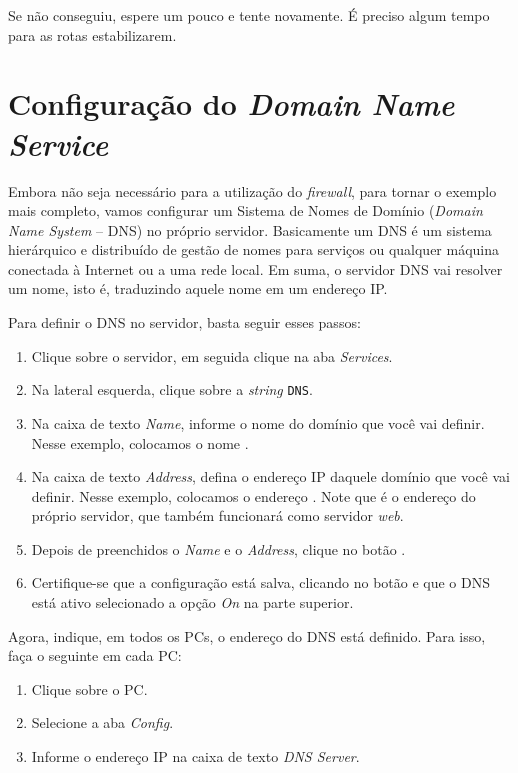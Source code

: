 Se não conseguiu, espere um pouco e tente novamente. É preciso algum tempo para as rotas estabilizarem.

\section{Configuração do \textit{Domain Name Service}}
Embora não seja necessário para a utilização do \textit{firewall}, para tornar o exemplo mais completo, vamos configurar um Sistema de Nomes de Domínio (\textit{Domain Name System} -- DNS) no próprio servidor. Basicamente um DNS é um sistema hierárquico e distribuído de gestão de nomes para  serviços ou qualquer máquina conectada à Internet ou a uma rede local. Em suma, o servidor DNS vai resolver um nome, isto é, traduzindo aquele nome em um endereço IP.

Para definir o DNS no servidor, basta seguir esses passos:
\begin{enumerate}[label*=\arabic*.]
\item Clique sobre o servidor, em seguida clique na aba \textit{Services}.
\item Na lateral esquerda, clique sobre a \textit{string}  \texttt{DNS}.
\item Na caixa de texto \textit{Name}, informe o nome do domínio que você vai definir. Nesse exemplo, colocamos o nome .
\item Na caixa de texto \textit{Address}, defina o endereço IP daquele domínio que você vai definir. Nesse exemplo, colocamos o endereço . Note que é o endereço do próprio servidor, que também funcionará como servidor \textit{web}.
\item Depois de preenchidos o \textit{Name} e o \textit{Address}, clique no botão .
\item Certifique-se que a configuração está salva, clicando no botão  e que o DNS está ativo selecionado a opção \textit{On} na parte superior.
\end{enumerate}

Agora, indique, em todos os PCs, o endereço do DNS está definido. Para isso, faça o seguinte em cada PC:

\begin{enumerate}[label*=\arabic*.]
\item Clique sobre o PC.
\item Selecione a aba \textit{Config}.
\item Informe o endereço IP  na caixa de texto \textit{DNS Server}.
\end{enumerate}

